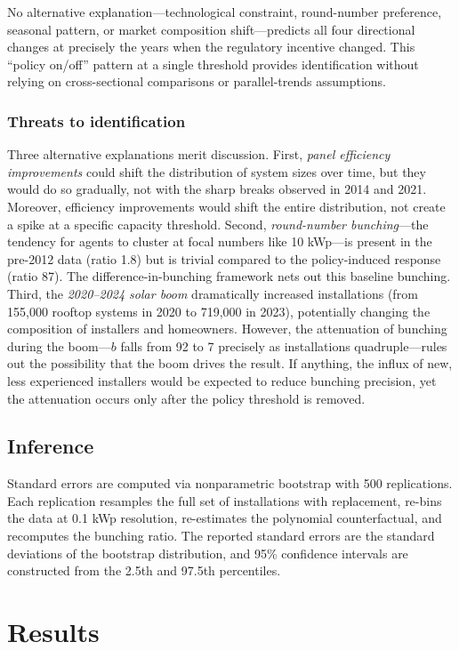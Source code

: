 \documentclass[12pt]{article}
\begin{document}
No alternative explanation---technological constraint, round-number preference, seasonal pattern, or market composition shift---predicts all four directional changes at precisely the years when the regulatory incentive changed. This ``policy on/off'' pattern at a single threshold provides identification without relying on cross-sectional comparisons or parallel-trends assumptions.

\subsubsection*{Threats to identification} Three alternative explanations merit discussion. First, \textit{panel efficiency improvements} could shift the distribution of system sizes over time, but they would do so gradually, not with the sharp breaks observed in 2014 and 2021. Moreover, efficiency improvements would shift the entire distribution, not create a spike at a specific capacity threshold. Second, \textit{round-number bunching}---the tendency for agents to cluster at focal numbers like 10 kWp---is present in the pre-2012 data (ratio 1.8) but is trivial compared to the policy-induced response (ratio 87). The difference-in-bunching framework nets out this baseline bunching. Third, the \textit{2020--2024 solar boom} dramatically increased installations (from 155,000 rooftop systems in 2020 to 719,000 in 2023), potentially changing the composition of installers and homeowners. However, the attenuation of bunching during the boom---$b$ falls from 92 to 7 precisely as installations quadruple---rules out the possibility that the boom drives the result. If anything, the influx of new, less experienced installers would be expected to reduce bunching precision, yet the attenuation occurs only after the policy threshold is removed.

\subsection{Inference}

Standard errors are computed via nonparametric bootstrap with 500 replications. Each replication resamples the full set of installations with replacement, re-bins the data at 0.1 kWp resolution, re-estimates the polynomial counterfactual, and recomputes the bunching ratio. The reported standard errors are the standard deviations of the bootstrap distribution, and 95\% confidence intervals are constructed from the 2.5th and 97.5th percentiles.


\section{Results}
\label{sec:results}
\end{document}
